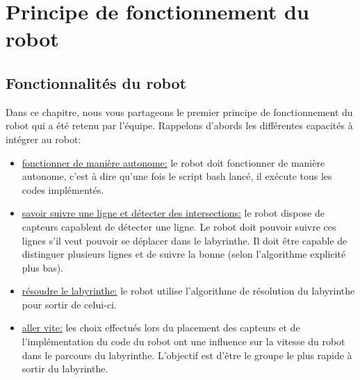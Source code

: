 \chapter{Principe de fonctionnement du robot}
        \section{Fonctionnalités du robot}
                Dans ce chapitre, nous vous partageons le premier principe de fonctionnement du robot qui a été retenu par l'équipe. Rappelons d'abords les différentes capacités à intégrer au robot:
                \vspace{1mm}
                \begin{itemize}
                        \item \underline{fonctionner de manière autonome:} le robot doit fonctionner de manière autonome, c'est à dire qu'une fois le script bash lancé, il exécute tous les codes implémentés.
                \end{itemize}
                \vspace{1mm}

                \begin{itemize}
                        \item \underline{savoir suivre une ligne et détecter des intersections:} le robot dispose de capteurs capablent de détecter une ligne. Le robot doit pouvoir suivre ces lignes s'il veut pouvoir se déplacer dans le labyrinthe. Il doit être capable de distinguer plusieurs lignes et de suivre la bonne (selon l'algorithme explicité plus bas).
                \end{itemize}
                \vspace{1mm}

                \begin{itemize}
                        \item \underline{résoudre le labyrinthe:} le robot utilise l'algorithme de résolution du labyrinthe pour sortir de celui-ci.
                \end{itemize}
                \vspace{1mm}

                \begin{itemize}
                        \item \underline{aller vite:} les choix effectués lors du placement des capteurs et de l'implémentation du code du robot ont une influence sur la vitesse du robot dans le parcours du labyrinthe. L'objectif est d'être le groupe le plus rapide à sortir du labyrinthe.
                \end{itemize}
                \vspace{1mm}


